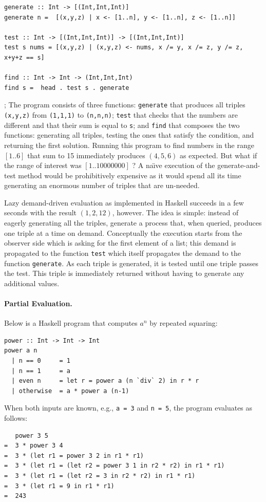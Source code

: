 \documentclass{article}
\begin{document}
\begin{verbatim}
generate :: Int -> [(Int,Int,Int)]
generate n =  [(x,y,z) | x <- [1..n], y <- [1..n], z <- [1..n]]

test :: Int -> [(Int,Int,Int)] -> [(Int,Int,Int)]
test s nums = [(x,y,z) | (x,y,z) <- nums, x /= y, x /= z, y /= z, x+y+z == s]

find :: Int -> Int -> (Int,Int,Int)
find s =  head . test s . generate
\end{verbatim}
;
The program consists of three functions: \verb|generate| that produces
all triples \verb|(x,y,z)| from \verb|(1,1,1)| to \verb|(n,n,n)|;
\verb|test| that checks that the numbers are different and that their
sum is equal to \verb|s|; and \verb|find| that composes the two
functions: generating all triples, testing the ones that satisfy the
condition, and returning the first solution. Running this program to
find numbers in the range $[1..6]$ that sum to 15 immediately produces
$(4,5,6)$ as expected. But what if the range of interest was
$[1..10000000]$ ? A na\"\i ve execution of the generate-and-test
method would be prohibitively expensive as it would spend all its time
generating an enormous number of triples that are un-needed.

Lazy demand-driven evaluation as implemented in Haskell succeeds in a
few seconds with the result $(1,2,12)$, however. The idea is simple:
instead of eagerly generating all the triples, generate a process
that, when queried, produces one triple at a time on
demand. Conceptually the execution starts from the observer side which
is asking for the first element of a list; this demand is propagated
to the function \verb|test| which itself propagates the demand to the
function \verb|generate|. As each triple is generated, it is tested
until one triple passes the test. This triple is immediately returned
without having to generate any additional values.

\paragraph*{Partial Evaluation.}
Below is a Haskell program that computes $a^n$ by repeated squaring:
\begin{verbatim}
power :: Int -> Int -> Int
power a n
  | n == 0     = 1
  | n == 1     = a
  | even n     = let r = power a (n `div` 2) in r * r 
  | otherwise  = a * power a (n-1)
\end{verbatim}
When both inputs are known, e.g., \verb|a = 3| and \verb|n = 5|, the
program evaluates as follows:
\begin{verbatim}
   power 3 5
=  3 * power 3 4
=  3 * (let r1 = power 3 2 in r1 * r1)
=  3 * (let r1 = (let r2 = power 3 1 in r2 * r2) in r1 * r1)
=  3 * (let r1 = (let r2 = 3 in r2 * r2) in r1 * r1)
=  3 * (let r1 = 9 in r1 * r1)
=  243
\end{verbatim}
\end{document}

